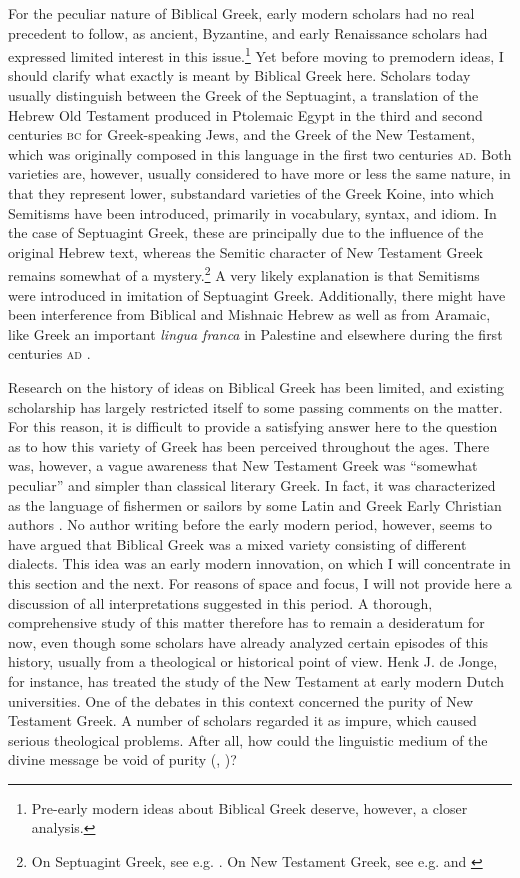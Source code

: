 For the peculiar nature of Biblical Greek, early modern scholars had no real precedent to follow, as ancient, Byzantine, and early Renaissance scholars had expressed limited interest in this issue.\footnote{Pre-early modern ideas about Biblical Greek deserve, however, a closer analysis.} Yet before moving to premodern ideas, I should clarify what exactly is meant by Biblical Greek here. Scholars today usually distinguish between the Greek of the Septuagint, a translation of the Hebrew Old Testament produced in Ptolemaic Egypt in the third and second centuries \textsc{bc} for Greek-speaking Jews, and the Greek of the New Testament, which was originally composed in this language in the first two centuries \textsc{ad}. Both varieties are, however, usually considered to have more or less the same nature, in that they represent lower, substandard varieties of the Greek Koine, into which Semitisms have been introduced, primarily in vocabulary, syntax, and idiom. In the case of Septuagint Greek, these are principally due to the influence of the original Hebrew text, whereas the Semitic character of New Testament Greek remains somewhat of a mystery.\footnote{On Septuagint Greek, see e.g. \citet[106--108]{Horrocks2010}. On New Testament Greek, see e.g. \citet{Janse2007} and \citet{Porter2013}} A very likely explanation is that Semitisms were introduced in imitation of Septuagint Greek. Additionally, there might have been interference from Biblical and Mishnaic Hebrew as well as from Aramaic, like Greek an important \textit{lingua franca} in Palestine and elsewhere during the first centuries \textsc{ad} \citep{Janse2007}.

Research on the history of ideas on Biblical Greek has been limited, and existing scholarship has largely restricted itself to some passing comments on the matter. For this reason, it is difficult to provide a satisfying answer here to the question as to how this variety of Greek has been perceived throughout the ages. There was, however, a vague awareness that New Testament Greek was “somewhat peculiar” and simpler than classical literary Greek. In fact, it was characterized as the language of fishermen or sailors by some Latin and Greek Early Christian authors \citep[647]{Janse2007}. No author writing before the early modern period, however, seems to have argued that Biblical Greek was a mixed variety consisting of different dialects. This idea was an early modern innovation, on which I will concentrate in this section and the next. For reasons of space and focus, I will not provide here a discussion of all interpretations suggested in this period. A thorough, comprehensive study of this matter therefore has to remain a desideratum for now, even though some scholars have already analyzed certain episodes of this history, usually from a theological or historical point of view. Henk J. de Jonge, for instance, has treated the study of the New Testament at early modern Dutch universities. One of the debates in this context concerned the purity of New Testament Greek. A number of scholars regarded it as impure, which caused serious theological problems. After all, how could the linguistic medium of the divine message be void of purity (, )?

